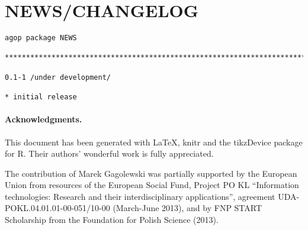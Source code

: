 \documentclass[11pt]{article}\usepackage{graphicx, color}
\makeatletter
\newenvironment{kframe}{%
 \def\at@end@of@kframe{}%
 \ifinner\ifhmode%
  \def\at@end@of@kframe{\end{minipage}}%
  \begin{minipage}{\columnwidth}%
 \fi\fi%
 \def\FrameCommand##1{\hskip\@totalleftmargin \hskip-\fboxsep
 \colorbox{shadecolor}{##1}\hskip-\fboxsep
     \hskip-\linewidth \hskip-\@totalleftmargin \hskip\columnwidth}%
 \MakeFramed {\advance\hsize-\width
   \@totalleftmargin\z@ \linewidth\hsize
   \@setminipage}}%
 {\par\unskip\endMakeFramed%
 \at@end@of@kframe}
\newenvironment{knitrout}{}{} %
\newcommand{\package}[1]{\textsf{#1}\xspace}
\newcommand{\lang}[1]{\textsf{#1}\xspace}
\newcommand{\R}{\lang{R}}
\theoremstyle{remark}
\theoremstyle{definition}
\makeatother
\begin{document}



\section{NEWS/CHANGELOG}

\begin{knitrout}\small
{}\color{fgcolor}\begin{kframe}
\begin{verbatim}
agop package NEWS

***************************************************************************

0.1-1 /under development/

* initial release
\end{verbatim}
\end{kframe}
\end{knitrout}



\paragraph{Acknowledgments.}
This document has been generated with \LaTeX, \package{knitr} and
the \package{tikzDevice} package for \R.
Their authors' wonderful work is fully appreciated.


The contribution of Marek Gagolewski was partially supported
by the European Union from resources of the European Social Fund, Project PO KL 
``Information technologies: Research and their interdisciplinary
applications'', agreement UDA-POKL.04.01.01-00-051/10-00 (March-June 2013),
and by FNP START Scholarship from the Foundation for Polish Science (2013).





\end{document}
